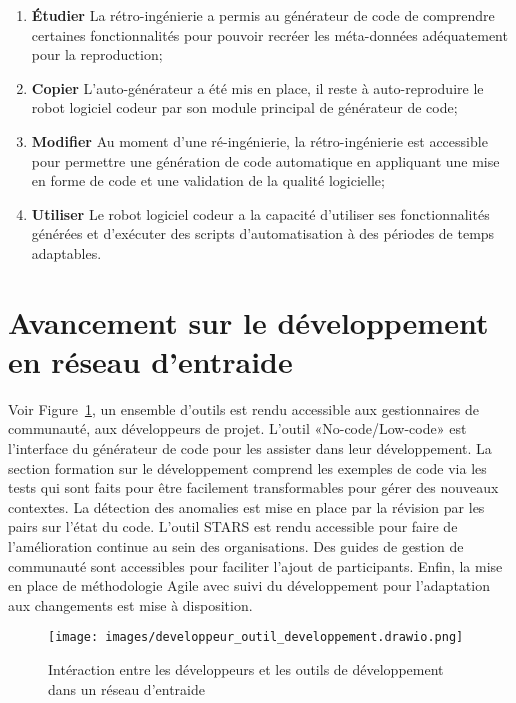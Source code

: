 \begin{enumerate}
    \item \textbf{Étudier} La rétro-ingénierie a permis au générateur de code de comprendre certaines fonctionnalités pour pouvoir recréer les méta-données adéquatement pour la reproduction;
    \item \textbf{Copier} L’auto-générateur a été mis en place, il reste à auto-reproduire le robot logiciel codeur par son module principal de générateur de code;
    \item \textbf{Modifier} Au moment d'une ré-ingénierie, la rétro-ingénierie est accessible pour permettre une génération de code automatique en appliquant une mise en forme de code et une validation de la qualité logicielle;
    \item \textbf{Utiliser} Le robot logiciel codeur a la capacité d’utiliser ses fonctionnalités générées et d’exécuter des scripts d’automatisation à des périodes de temps adaptables.
\end{enumerate}

\section{Avancement sur le développement en réseau d'entraide}

Voir Figure~\ref{fig:dia_outil_dev_reseau_entraide}, un ensemble d'outils est rendu accessible aux gestionnaires de communauté, aux développeurs de projet. L'outil «No-code/Low-code» est l'interface du générateur de code pour les assister dans leur développement. La section formation sur le développement comprend les exemples de code via les tests qui sont faits pour être facilement transformables pour gérer des nouveaux contextes. La détection des anomalies est mise en place par la révision par les pairs sur l'état du code. L'outil STARS est rendu accessible pour faire de l'amélioration continue au sein des organisations. Des guides de gestion de communauté sont accessibles pour faciliter l'ajout de participants. Enfin, la mise en place de méthodologie Agile avec suivi du développement pour l'adaptation aux changements est mise à disposition.

\begin{figure}
\centering
\texttt{[image: images/developpeur\_outil\_developpement.drawio.png]}
\caption{Intéraction entre les développeurs et les outils de développement dans un réseau d'entraide}
\label{fig:dia_outil_dev_reseau_entraide}
\end{figure}

